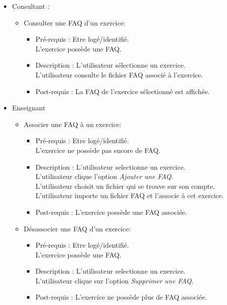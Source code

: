 	\begin{itemize}
	\item Consultant :
		\begin{itemize}
			\item Consulter une FAQ d'un exercice:
			\begin{itemize}
			\item Pr{\'e}-requis : Etre log{\'e}/identifi{\'e}.\\
			L'exercice poss{\`e}de une FAQ.
			\item Description :  L'utilisateur s{\'e}lectionne un exercice.\\
			L'utilisateur consulte le fichier FAQ associ{\'e} {\`a} l'exercice.
			\item Post-requis : La FAQ de l'exercice s{\'e}lectionn{\'e} est affich{\'e}e.
			\end{itemize}		
		\end{itemize}

	\item Enseignant
		\begin{itemize}
		\item Associer une FAQ {\`a} un exercice:
			\begin{itemize}
			\item Pr{\'e}-requis : Etre log{\'e}/identifi{\'e}.\\
			L'exercice ne poss{\`e}de pas encore de FAQ.
			\item Description :  L'utilisateur selectionne un exercice.\\
			L'utilisateur clique l'option {\it Ajouter une FAQ}.\\
			L'utilisateur choisit un fichier qui se trouve sur son compte.
			L'utilisateur importe un fichier FAQ et l'associe {\`a} cet exercice.
			\item Post-requis : L'exercice poss{\`e}de une FAQ associ{\'e}e.
			\end{itemize}

		\item D{\'e}sassocier une FAQ d'un exercice:
			\begin{itemize}
			\item Pr{\'e}-requis : Etre log{\'e}/identifi{\'e}.\\
			L'exercice poss{\`e}de une FAQ.
			\item Description :  L'utilisateur selectionne un exercice.\\
			L'utilisateur clique sur l'option {\it Supprimer une FAQ}.
			\item Post-requis : L'exercice ne poss{\`e}de plus de FAQ associ{\'e}e.\\
			\end{itemize}
		\end{itemize}
	\end{itemize}

